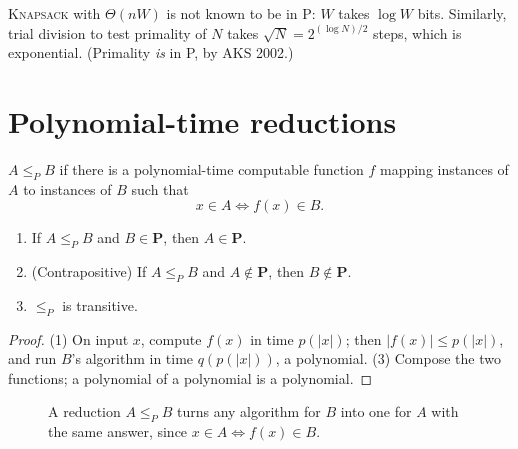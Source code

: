 \begin{important}
\textsc{Knapsack} with $\Theta(nW)$ is not known to be in P: $W$ takes $\log W$ bits. Similarly, trial division to test primality of $N$ takes
$\sqrt N=2^{(\log N)/2}$ steps, which is exponential. (Primality \emph{is} in P, by AKS 2002.)
\end{important}

\section{Polynomial-time reductions}
\begin{definition}
$A\le_P B$ if there is a polynomial-time computable function $f$ mapping instances of $A$ to instances of $B$ such that
\[
x\in A\iff f(x)\in B.
\]
\end{definition}
\begin{lemma}
\begin{enumerate}
  \item If $A\le_PB$ and $B\in\mathbf P$, then $A\in\mathbf P$.
  \item (Contrapositive) If $A\le_PB$ and $A\notin\mathbf P$, then $B\notin\mathbf P$.
  \item $\le_P$ is transitive.
\end{enumerate}
\end{lemma}
\begin{proof}
(1) On input $x$, compute $f(x)$ in time $p(|x|)$; then $|f(x)|\le p(|x|)$, and run $B$'s algorithm in time $q(p(|x|))$, a polynomial.
(3) Compose the two functions; a polynomial of a polynomial is a polynomial.
\end{proof}

\begin{figure}[H]
\centering
{}
\caption{A reduction $A\le_P B$ turns any algorithm for $B$ into one for
$A$ with the same answer, since $x\in A\iff f(x)\in B$.}
\end{figure}

